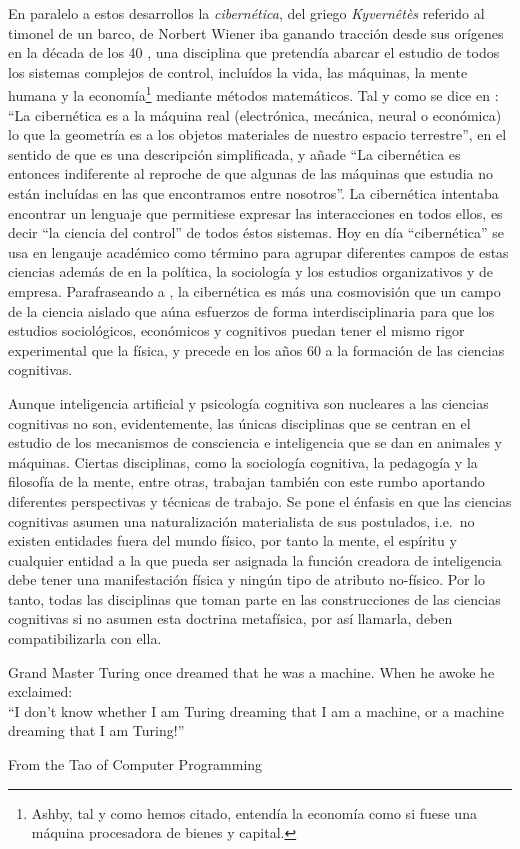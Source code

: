 \documentclass[12pt]{memoir}
\begin{document}
\begin{appendices}
En paralelo a estos desarrollos la \textit{cibernética}, del griego \textit{Kyvernêtès} referido al timonel de un barco, de Norbert Wiener iba ganando tracción desde sus orígenes en la década de los 40 \parencite[p.142-143]{theCognitiveRevolution}, una disciplina que pretendía abarcar el estudio de todos los sistemas complejos de control, incluídos la vida, las máquinas, la mente humana y la economía\footnote{Ashby, tal y como hemos citado, entendía la economía como si fuese una máquina procesadora de bienes y capital.} mediante métodos matemáticos. Tal y como se dice en \parencite[p.12]{ciberneticsAshby}: ``La cibernética es a la máquina real (electrónica, mecánica, neural o económica) lo que la geometría es a los objetos materiales de nuestro espacio terrestre'', en el sentido de que es una descripción simplificada, y añade ``La cibernética es entonces indiferente al reproche de que algunas de las máquinas que estudia no están incluídas en las que encontramos entre nosotros''. La cibernética intentaba encontrar un lenguaje que permitiese expresar las interacciones en todos ellos, es decir ``la ciencia del control'' de todos éstos sistemas. Hoy en día ``cibernética'' se usa en lengauje académico como término para agrupar diferentes campos de estas ciencias además de en la política, la sociología y los estudios organizativos y de empresa. Parafraseando a \parencite[p.103-104 y p.207-216]{pylyshyn70}, la cibernética es más una cosmovisión que un campo de la ciencia aislado que aúna esfuerzos de forma interdisciplinaria para que los estudios sociológicos, económicos y cognitivos puedan tener el mismo rigor experimental que la física, y precede en los años 60 a la formación de las ciencias cognitivas.

Aunque inteligencia artificial y psicología cognitiva son nucleares a las ciencias cognitivas no son, evidentemente, las únicas disciplinas que se centran en el estudio de los mecanismos de consciencia e inteligencia que se dan en animales y máquinas. Ciertas disciplinas, como la sociología cognitiva, la pedagogía y la filosofía de la mente, entre otras, trabajan también con este rumbo aportando diferentes perspectivas y técnicas de trabajo. Se pone el énfasis en que las ciencias cognitivas asumen una naturalización materialista de sus postulados, i.e.\ no existen entidades fuera del mundo físico, por tanto la mente, el espíritu y cualquier entidad a la que pueda ser asignada la función creadora de inteligencia debe tener una manifestación física y ningún tipo de atributo no-físico. Por lo tanto, todas las disciplinas que toman parte en las construcciones de las ciencias cognitivas si no asumen esta doctrina metafísica, por así llamarla, deben compatibilizarla con ella.
\end{appendices}



\newpage

\printbibliography

\newpage
\epigraph{Grand Master Turing once dreamed that he was a machine. When he awoke he exclaimed: \\

“I don't know whether I am Turing dreaming that I am a machine, or a machine dreaming that I am Turing!”}{From the Tao of Computer Programming}
\end{document}
